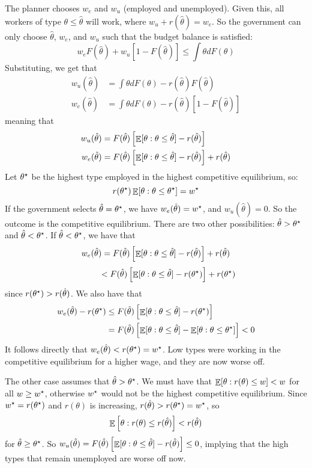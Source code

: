 \documentclass[12pt]{article}
\begin{document}
\begin{example}
	The planner chooses $w_e$ and $w_u$ (employed and unemployed). Given this, all workers of type $\theta \le \hat{\theta}$ will work, where $w_u + r(\hat{\theta}) = w_e$. So the government can only choose $\hat{\theta}$, $w_e$, and $w_u$ such that the budget balance is satisfied:
	\[
	w_e F(\hat{\theta}) + w_u [ 1 - F(\hat{\theta})] \le \int \theta dF(\theta)
	\]
	Substituting, we get that
	\begin{align*}
		w_u(\hat{\theta}) &= \int \theta dF(\theta) - r(\hat{\theta})F(\hat{\theta}) \\
		w_e(\hat{\theta}) &= \int \theta dF(\theta) - r(\hat{\theta})[1-F(\hat{\theta})]
	\end{align*}
	meaning that
	\begin{align*}
		w_u(\hat{\theta}) &=F(\hat{\theta}) \left[ \mathop{\mathbb{E}} [\theta : \theta \le \hat{\theta}] - r(\hat{\theta})\right] \\
		w_e(\hat{\theta}) &= F(\hat{\theta}) \left[ \mathop{\mathbb{E}} [\theta : \theta \le \hat{\theta}] - r(\hat{\theta})\right] + r(\hat{\theta})
	\end{align*}
	Let $\theta^\star$ be the highest type employed in the highest competitive equilibrium, so:
	\[
	r(\theta^\star) \mathop{\mathbb{E}}[\theta : \theta \le \theta^\star] = w^\star
	\]
	If the government selects $\hat{\theta} = \theta^\star$, we have $w_e(\hat{\theta}) = w^\star$, and $w_u(\hat{\theta}) = 0$. So the outcome is the competitive equilibrium. There are two other possibilities: $\hat{\theta} > \theta^\star$ and $\hat{\theta} < \theta^\star$. If $\hat{\theta} < \theta^\star$, we have that
	\[
	w_e(\hat{\theta}) = F(\hat{\theta}) \left[ \mathop{\mathbb{E}} [\theta : \theta \le \hat{\theta}] - r(\hat{\theta})\right] + r(\hat{\theta})
	\]
	\[
	\qquad\quad< F(\hat{\theta}) \left[ \mathop{\mathbb{E}} [\theta : \theta \le \hat{\theta}] - r(\theta^\star)\right] + r(\theta^\star)
	\]
	since $r(\theta^\star) > r(\hat{\theta})$. We also have that
	\begin{align*}
		w_e(\hat{\theta}) - r(\theta^\star) &\le F(\hat{\theta})\left[ \mathop{\mathbb{E}}[\theta : \theta \le \hat{\theta}] - r(\theta^\star)\right] \\
		&= F(\hat{\theta})\left[ \mathop{\mathbb{E}}[\theta : \theta \le \hat{\theta}] -\mathop{\mathbb{E}}[\theta : \theta \le \theta^\star]\right] < 0
	\end{align*}
	It follows directly that $w_e(\hat{\theta}) < r(\theta^\star) = w^\star$. Low types were working in the competitive equilibrium for a higher wage, and they are now worse off.
	
	The other case assumes that $\hat{\theta} > \theta^\star$. We must have that $\mathop{\mathbb{E}}[\theta : r(\theta) \le w] < w$ for all $w \ge w^\star$, otherwise $w^\star$ would not be the highest competitive equilibrium. Since $w^\star = r(\theta^\star)$ and $r(\theta)$ is increasing, $r(\hat{\theta}) > r(\theta^\star) = w^\star$, so
	\[
	\mathop{\mathbb{E}}\left[ \theta : r(\theta) \le r(\hat{\theta})\right] < r(\hat{\theta})
	\]
	for $\hat{\theta} \ge \theta^\star$. So $w_u(\hat{\theta}) = F(\hat{\theta}) \left[ \mathop{\mathbb{E}}[\theta : \theta \le \hat{\theta}] - r(\hat{\theta})\right] \le 0$, implying that the high types that remain unemployed are worse off now.
\end{example}
\end{document}

